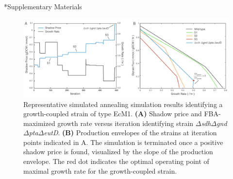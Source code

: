 \documentclass[12pt]{article}
\date{}
\makeatletter
\renewcommand\section{\@startsection
	{subsection}{2}{0mm}
	{-0.2in}
	{0.05\baselineskip}
	{\normalfont\large\bfseries}}
\makeatother
\begin{document}
\section*{Supplementary Materials}

\begin{figure}[b]\centering
\includegraphics[width=1.0\textwidth]{./figures/sup-fig1-prod-env-single.pdf}
\caption{Representative simulated annealing simulation results identifying a growth-coupled strain of type EcM1. \textbf{(A)} Shadow price and FBA-maximized growth rate versus iteration identifying strain $\Delta$\textit{sdh}$\Delta$\textit{gnd}$\Delta$\textit{pta}$\Delta$\textit{eutD}. \textbf{(B)} Production envelopes of the strains at iteration points indicated in A. The simulation is terminated once a positive shadow price is found, visualized by the slope of the production envelope. The red dot indicates the optimal operating point of maximal growth rate for the growth-coupled strain.}
\label{fig:CH2-prod-env-single}
\end{figure}


\newpage
%
%
\end{document}
